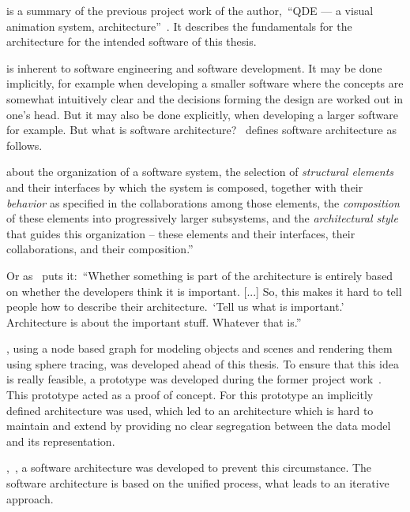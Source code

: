 \documentclass[%
    a4paper,    %
    justified,  %
    nobib,      %
    openany     %
]{tufte-book}
\begin{document}
 is a summary of the previous
project work of the author,~\enquote{QDE --- a visual animation system,
architecture}~\cite{osterwalder_qde_2016}. It describes the fundamentals for the
architecture for the intended software of this thesis.

 is inherent to software engineering and
software development. It may be done implicitly, for example when developing a
smaller software where the concepts are somewhat intuitively clear and the
decisions forming the design are worked out in one's head. But it may also be
done explicitly, when developing a larger software for example. But what is
software architecture?~\citeauthor{kruchten_rup_2003} defines software
architecture as follows.

 about the organization of a software system, the selection of
\textit{structural elements} and their interfaces by which the system is
composed, together with their \textit{behavior} as specified in the
collaborations among those elements, the \textit{composition} of these elements
into progressively larger subsystems, and the \textit{architectural style} that
guides this organization -- these elements and their interfaces, their
collaborations, and their composition.''~\cite{kruchten_rup_2003}

Or as~\citeauthor{fowler_architect_2003} puts it:~\enquote{Whether something
is part of the architecture is entirely based on whether the developers think it
is important. [...] So, this makes it hard to tell people how to describe their
architecture.~\enquote{Tell us what is important.} Architecture is about the
important stuff. Whatever that is.}~\cite{fowler_architect_2003}

, using a node based graph for
modeling objects and scenes and rendering them using sphere tracing, was
developed ahead of this thesis. To ensure that this idea is really feasible, a
prototype was developed during the former project
work~. This prototype acted as a proof of
concept. For this prototype an implicitly defined architecture was used, which
led to an architecture which is hard to maintain and extend by providing no
clear segregation between the data model and its representation.

,~, a
software architecture was developed to prevent this circumstance. The software
architecture is based on the unified process, what leads to an iterative
approach.
\end{document}
